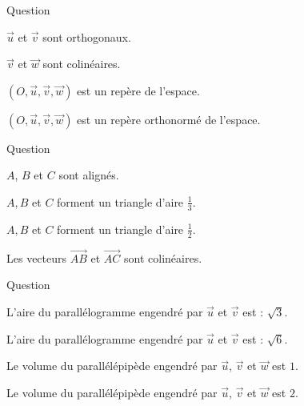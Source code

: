 

\begin{multi}[multiple,feedback=
{Deux vecteurs \(\vec{u}\) et \(\vec{v}\) sont orthogonaux si et seulement si \( \vec{u} \cdot \vec{v}=0\).
\((O,\vec{u},\vec{v},\vec{w})\) est un repère si et seulement si \(\det (\vec{u},\vec{v},\vec{w}) \neq 0\).
}]{Question}
    \item* \(\vec{u}\) et \(\vec{v}\) sont orthogonaux.
    \item \(\vec{v}\) et \(\vec{w}\) sont colinéaires.
    \item* \((O,\vec{u},\vec{v},\vec{w})\) est un repère de l'espace.
    \item \((O,\vec{u},\vec{v},\vec{w})\) est un repère orthonormé de l'espace.
\end{multi}


\begin{multi}[multiple,feedback=
{L'aire du triangle \(ABC\) est donnée par : \(\frac{1}{2} \Vert \overrightarrow{AB} \wedge \overrightarrow{AC} \Vert\). 
}]{Question}
    \item \(A\), \(B\) et \(C\) sont alignés.
    \item \(A,B\) et \(C\) forment un triangle d'aire \(\frac{1}{3}\).
    \item* \(A,B\) et \(C\) forment un triangle d'aire \(\frac{1}{2}\).
    \item Les vecteurs \(\overrightarrow{AB}\) et  \(\overrightarrow{AC}\) sont colinéaires.
\end{multi}


\begin{multi}[multiple,feedback=
{L'aire du parallélogramme engendré par deux vecteurs \(\vec{u}\) et \(\vec{v}\) est donnée par : \( \Vert \vec{u} \wedge \vec{v} \Vert\).
Le volume du parallélépipède engendré par trois vecteurs \(\vec{u}\), \(\vec{v}\) et  \(\vec{w}\) est donné par : \(|\det (\vec{u}, \vec{v},\vec{w})|\).
}]{Question}
    \item L'aire du parallélogramme engendré par \(\vec{u}\) et  \(\vec{v}\) est : \(\sqrt 3\).
    \item* L'aire du parallélogramme engendré par \(\vec{u}\) et  \(\vec{v}\) est : \( \sqrt 6\).
    \item Le volume du parallélépipède engendré par \(\vec{u}\), \(\vec{v}\) et  \(\vec{w}\) est \(1\).
    \item* Le volume du parallélépipède engendré par \(\vec{u}\), \(\vec{v}\) et  \(\vec{w}\) est \(2\).
\end{multi}



